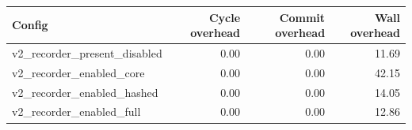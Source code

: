 \begin{tabular}{lrrr}
\toprule
Config & Cycle overhead & Commit overhead & Wall overhead \\
\midrule
v2\_recorder\_present\_disabled & 0.00 & 0.00 & 11.69 \\
v2\_recorder\_enabled\_core & 0.00 & 0.00 & 42.15 \\
v2\_recorder\_enabled\_hashed & 0.00 & 0.00 & 14.05 \\
v2\_recorder\_enabled\_full & 0.00 & 0.00 & 12.86 \\
\bottomrule
\end{tabular}
